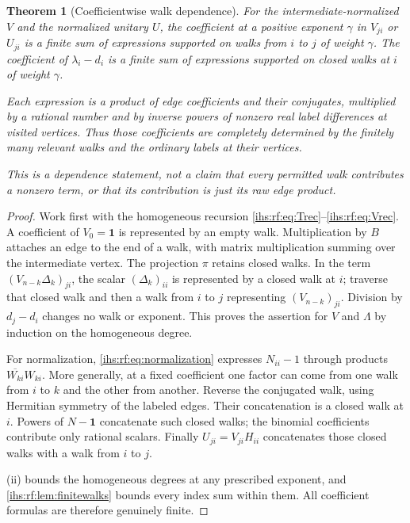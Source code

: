 \documentclass[11pt,a4paper]{article}
\numberwithin{equation}{section}
\newtheorem{theorem}{Theorem}[section]
\theoremstyle{definition}
\theoremstyle{remark}
\newcommand{\Id}{\mathbf 1}
\begin{document}
\begin{theorem}[Coefficientwise walk dependence]\label{ihs:rf:thm:walks}
For the intermediate-normalized $V$ and the normalized unitary $U$, the
coefficient at a positive exponent $\gamma$ in $V_{ji}$ or $U_{ji}$ is a
finite sum of expressions supported on walks from $i$ to $j$ of weight
$\gamma$. The coefficient of $\lambda_i-d_i$ is a finite sum of expressions
supported on closed walks at $i$ of weight $\gamma$.

Each expression is a product of edge coefficients and their conjugates,
multiplied by a rational number and by inverse powers of nonzero real label
differences at visited vertices. Thus those coefficients are completely
determined by the finitely many relevant walks and the ordinary labels at
their vertices.

This is a dependence statement, not a claim that every permitted walk
contributes a nonzero term, or that its contribution is just its raw edge
product.
\end{theorem}
\begin{proof}
Work first with the homogeneous recursion
\eqref{ihs:rf:eq:Trec}--\eqref{ihs:rf:eq:Vrec}. A coefficient of $V_0=\Id$
is represented by an empty walk. Multiplication by $B$ attaches an edge to
the end of a walk, with matrix multiplication summing over the intermediate
vertex. The projection $\pi$ retains closed walks. In the term
$(V_{n-k}\Delta_k)_{ji}$, the scalar $(\Delta_k)_{ii}$ is represented by a
closed walk at $i$; traverse that closed walk and then a walk from $i$ to
$j$ representing $(V_{n-k})_{ji}$. Division by $d_j-d_i$ changes no walk or
exponent. This proves the assertion for $V$ and $\Lambda$ by induction on
the homogeneous degree.

For normalization, \eqref{ihs:rf:eq:normalization} expresses $N_{ii}-1$
through products $\overline{W_{ki}}W_{ki}$. More generally, at a fixed
coefficient one factor can come from one walk from $i$ to $k$ and the other
from another. Reverse the conjugated walk, using Hermitian symmetry of the
labeled edges. Their concatenation is a closed walk at $i$. Powers of
$N-\Id$ concatenate such closed walks; the binomial coefficients contribute
only rational scalars. Finally $U_{ji}=V_{ji}H_{ii}$ concatenates those
closed walks with a walk from $i$ to $j$.

(ii) bounds the homogeneous degrees at any prescribed
exponent, and \cref{ihs:rf:lem:finitewalks} bounds every index sum within
them. All coefficient formulas are therefore genuinely finite.
\end{proof}
\end{document}

